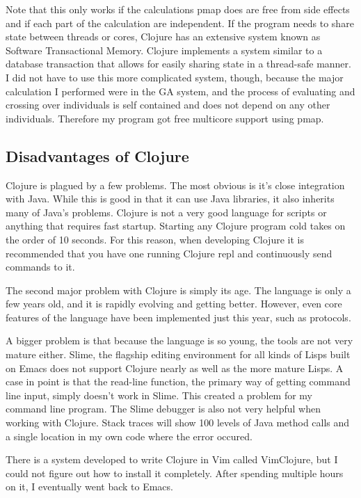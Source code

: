 \documentclass{article}
\begin{document}
Note that this only works if the calculations pmap does are free from side effects and if each part of the calculation are independent.  If the program needs to share state between threads or cores, Clojure has an extensive system known as Software Transactional Memory.  Clojure implements a system similar to a database transaction that allows for easily sharing state in a thread-safe manner.  I did not have to use this more complicated system, though, because the major calculation I performed were in the GA system, and the process of evaluating and crossing over individuals is self contained and does not depend on any other individuals.  Therefore my program got free multicore support using pmap.

\subsection{Disadvantages of Clojure}

Clojure is plagued by a few problems.  The most obvious is it's close integration with Java.  While this is good in that it can use Java libraries, it also inherits many of Java's problems.  Clojure is not a very good language for scripts or anything that requires fast startup.  Starting any Clojure program cold takes on the order of 10 seconds.  For this reason, when developing Clojure it is recommended that you have one running Clojure repl and continuously send commands to it.

The second major problem with Clojure is simply its age.  The language is only a few years old, and it is rapidly evolving and getting better.  However, even core features of the language have been implemented just this year, such as protocols.

A bigger problem is that because the language is so young, the tools are not very mature either.  Slime, the flagship editing environment for all kinds of Lisps built on Emacs does not support Clojure nearly as well as the more mature Lisps.  A case in point is that the read-line function, the primary way of getting command line input, simply doesn't work in Slime.  This created a problem for my command line program.  The Slime debugger is also not very helpful when working with Clojure.  Stack traces will show 100 levels of Java method calls and a single location in my own code where the error occured.

There is a system developed to write Clojure in Vim called VimClojure, but I could not figure out how to install it completely.  After spending multiple hours on it, I eventually went back to Emacs.
\end{document}
